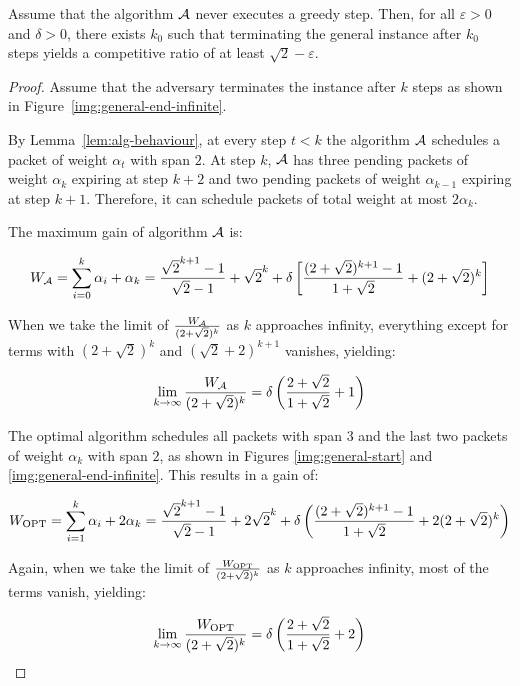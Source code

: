 \begin{lemma}\label{lem:general-infinite}
Assume that the algorithm $\mathcal{A}$ never executes a greedy step. Then, for all
$\varepsilon > 0$ and $\delta > 0$, there exists $k_0$ such that terminating the
general instance after $k_0$ steps yields a competitive ratio of at least
$\sqrt{2} - \varepsilon$.
\end{lemma}
\begin{proof}

Assume that the adversary terminates the instance after $k$ steps as shown in
Figure~\ref{img:general-end-infinite}.

By Lemma~\ref{lem:alg-behaviour}, at every step $t < k$ the algorithm $\mathcal{A}$
schedules a packet of weight $\alpha_t$ with span $2$. At step $k$, $\mathcal{A}$ has
three pending packets of weight $\alpha_k$ expiring at step $k + 2$ and two
pending packets of weight $\alpha_{k - 1}$ expiring at step $k + 1$. Therefore, it
can schedule packets of total weight at most $2\alpha_k$.

The maximum gain of algorithm $\mathcal{A}$ is:

$$
W_{\mathcal{A}} = \sum_{i=0}^{k} \alpha_i + \alpha_{k} =
\frac{\sqrt{2}^{k+1} - 1}{\sqrt{2} - 1} + \sqrt{2}^k +
\delta \left[ \frac{(2 + \sqrt{2})^{k+1} - 1}{1 + \sqrt{2}} + (2 + \sqrt{2})^k \right]
$$

When we take the limit of $\frac{W_{\mathcal{A}}}{(2 + \sqrt{2})^k}$ as $k$ approaches infinity,
everything except for terms with $(2 + \sqrt{2})^k$ and $(\sqrt{2} + 2)^{k+1}$
vanishes, yielding:

\begin{equation}\label{INF:eq1}
\lim_{k \to \infty} \frac{W_{\mathcal{A}}}{(2 + \sqrt{2})^k} =
\delta \left( \frac{2 + \sqrt{2}}{1 + \sqrt{2}} + 1 \right)
\end{equation}

The optimal algorithm schedules all packets with span $3$ and the last two
packets of weight $\alpha_{k}$ with span $2$, as shown in Figures
\ref{img:general-start} and \ref{img:general-end-infinite}. This results in a
gain of:

$$
W_{\text{OPT}} = \sum_{i=1}^{k} \alpha_i + 2\alpha_k =
\frac{\sqrt{2}^{k+1} - 1}{\sqrt{2} - 1} + 2\sqrt{2}^k + \delta \left( \frac{(2 + \sqrt{2})^{k+1} - 1}{1 + \sqrt{2}} + 2(2 + \sqrt{2})^k\right)
$$

Again, when we take the limit of $\frac{W_{\text{OPT}}}{(2 + \sqrt{2})^k}$ as $k$ approaches
infinity, most of the terms vanish, yielding:

\begin{equation}\label{INF:eq2}
\lim_{k \to \infty} \frac{W_{\text{OPT}}}{(2 + \sqrt{2})^k} =
\delta \left( \frac{2 + \sqrt{2}}{1 + \sqrt{2}} + 2 \right)
\end{equation}


\end{proof}
